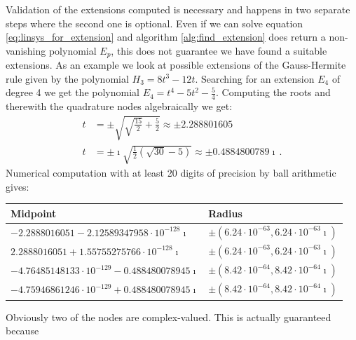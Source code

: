 \documentclass[a4paper,10pt]{article}
\begin{document}
Validation of the extensions computed is necessary and happens in
two separate steps where the second one is optional. Even if we
can solve equation \eqref{eq:linsys_for_extension} and algorithm
\ref{alg:find_extension} does return a non-vanishing polynomial $E_p$,
this does not guarantee we have found a suitable extensions.
As an example we look at possible extensions of the Gauss-Hermite rule
given by the polynomial $H_3 = 8t^3 - 12t$. Searching for an extension
$E_4$ of degree 4 we get the polynomial $E_4 = t^4 - 5t^2 - \frac{5}{4}$.
Computing the roots and therewith the quadrature nodes algebraically we get:
\begin{align*}
  t &= \pm\sqrt{\sqrt{\frac{15}{2}}+\frac{5}{2}} \approx \pm 2.288801605\\
  t &= \pm \imath \sqrt{\frac{1}{2} \left(\sqrt{30}-5\right)} \approx \pm 0.4884800789 \imath \,.
\end{align*}
Numerical computation with at least 20 digits of precision by ball arithmetic gives:
\begin{table}[h]
  \centering
  \begin{tabular}{|l|l|}
  \hline
  Midpoint & Radius \\
  \hline
  $-2.2888016051 - 2.12589347958 \cdot 10^{-128}\imath$   & $\pm (6.24 \cdot 10^{-63}, 6.24 \cdot 10^{-63}\imath)$ \\
  $2.2888016051 + 1.55755275766 \cdot 10^{-128}\imath$    & $\pm (6.24 \cdot 10^{-63}, 6.24 \cdot 10^{-63}\imath)$ \\
  $-4.76485148133 \cdot 10^{-129} - 0.488480078945\imath$ & $\pm (8.42 \cdot 10^{-64}, 8.42 \cdot 10^{-64}\imath)$ \\
  $-4.75946861246 \cdot 10^{-129} + 0.488480078945\imath$ & $\pm (8.42 \cdot 10^{-64}, 8.42 \cdot 10^{-64}\imath)$ \\
  \hline
  \end{tabular}
\end{table}
Obviously two of the nodes are complex-valued. This is actually guaranteed because
\end{document}
